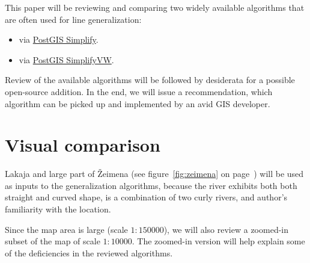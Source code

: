 \documentclass[a4paper]{article}
\begin{document}
This paper will be reviewing and comparing two widely available algorithms that
are often used for line generalization:
\begin{itemize}
    \item \cite{douglas1973algorithms} via
        \href{https://postgis.net/docs/ST_Simplify.html}{PostGIS Simplify}.

    \item \cite{visvalingam1993line} via
        \href{https://postgis.net/docs/ST_SimplifyVW.html}{PostGIS SimplifyVW}.
\end{itemize}

Review of the available algorithms will be followed by desiderata for a
possible open-source addition. In the end, we will issue a recommendation,
which algorithm can be picked up and implemented by an avid GIS developer.

\section{Visual comparison}

Lakaja and large part of Žeimena (see figure~\ref{fig:zeimena} on
page~\pageref{fig:zeimena}) will be used as inputs to the generalization
algorithms, because the river exhibits both both straight and curved shape, is
a combination of two curly rivers, and author's familiarity with the location.

Since the map area is large (scale $1:150 000$), we will also review a
zoomed-in subset of the map of scale $1:10 000$. The zoomed-in version will
help explain some of the deficiencies in the reviewed algorithms.
\end{document}
